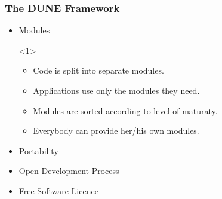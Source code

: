 \documentclass[aspectratio=169,11pt]{beamer}
\theoremstyle{definition}
\begin{document}
\begin{frame} \frametitle{The DUNE Framework}
  \label{dunedevelopment}
  \hspace*{-.7cm}
    \begin{minipage}[t]{0.54\textwidth}
        \begin{itemize}
        \item Modules
          \begin{onlyenv}<1>
            \begin{itemize}
            \item Code is split into separate modules.
            \item Applications use only the modules they need.
            \item Modules are sorted according to level of maturaty.
            \item Everybody can provide her/his own modules.
            \end{itemize}
          \end{onlyenv}
        \item Portability
        \item Open Development Process
        \item Free Software Licence

\end{itemize}
\end{minipage}
\end{frame}
\end{document}
